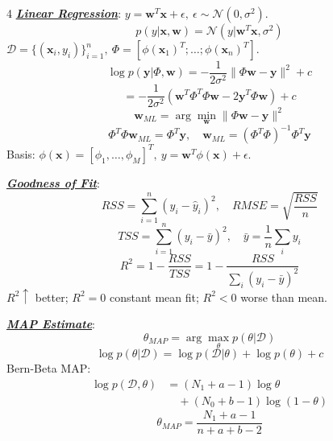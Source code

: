 \documentclass[12pt]{article}
\newcommand{\bulletPoint}[1]{\ul{\textit{\textbf{#1}}}}
\begin{document}
\begin{multicols*}{4}
\bulletPoint{Linear Regression}:
$y=\mathbf{w}^T\mathbf{x}+\epsilon,\ \epsilon\sim\mathcal{N}(0,\sigma^2)$.
\useshortskip \begin{equation*}
    p(y|\mathbf{x},\mathbf{w})=\mathcal{N}(y|\mathbf{w}^T\mathbf{x},\sigma^2)
\end{equation*}
$\mathcal{D}=\{(\mathbf{x}_i,y_i)\}_{i=1}^n,\ \Phi=[\phi(\mathbf{x}_1)^T;\ldots;\phi(\mathbf{x}_n)^T]$.
\useshortskip \begin{equation*}
    \log p(\mathbf{y}|\Phi,\mathbf{w})=-\frac{1}{2\sigma^2}\|\Phi\mathbf{w}-\mathbf{y}\|^2+c
\end{equation*}
\useshortskip \begin{equation*}
    \scriptstyle =-\frac{1}{2\sigma^2}(\mathbf{w}^T\Phi^T\Phi\mathbf{w}-2\mathbf{y}^T\Phi\mathbf{w})+c
\end{equation*}
\useshortskip \begin{equation*}
    \mathbf{w}_{ML}=\arg\min_{\mathbf{w}}\|\Phi\mathbf{w}-\mathbf{y}\|^2
\end{equation*}
\useshortskip \begin{equation*}
    \Phi^T\Phi\mathbf{w}_{ML}=\Phi^T\mathbf{y},\quad
    \mathbf{w}_{ML}=(\Phi^T\Phi)^{-1}\Phi^T\mathbf{y}
\end{equation*}
Basis: $\phi(\mathbf{x})=[\phi_1,\ldots,\phi_M]^T,\ y=\mathbf{w}^T\phi(\mathbf{x})+\epsilon$.

\bulletPoint{Goodness of Fit}:
\useshortskip \begin{equation*}
    RSS=\sum_{i=1}^n(y_i-\hat{y}_i)^2,\quad RMSE=\sqrt{\frac{RSS}{n}}
\end{equation*}
\useshortskip \begin{equation*}
    TSS=\sum_{i=1}^n(y_i-\bar{y})^2,\quad \bar{y}=\frac{1}{n}\sum_i y_i
\end{equation*}
\useshortskip \begin{equation*}
    R^2=1-\frac{RSS}{TSS}=1-\frac{RSS}{\sum_i(y_i-\bar{y})^2}
\end{equation*}
$R^2\uparrow$ better; $R^2=0$ constant mean fit; $R^2<0$ worse than mean.

\bulletPoint{MAP Estimate}:
\useshortskip \begin{equation*}
    \theta_{MAP}=\arg\max_\theta p(\theta|\mathcal{D})
\end{equation*}
\useshortskip \begin{equation*}
    \log p(\theta|\mathcal{D})=\log p(\mathcal{D}|\theta)+\log p(\theta)+c
\end{equation*}
Bern-Beta MAP:
\useshortskip \begin{equation*}
    \begin{split}
        \log p(\mathcal{D},\theta)
        &=(N_1+a-1)\log\theta\\
        &\quad+(N_0+b-1)\log(1-\theta)
    \end{split}
\end{equation*}
\useshortskip \begin{equation*}
    \theta_{MAP}=\frac{N_1+a-1}{n+a+b-2}
\end{equation*}


\end{multicols*}
\end{document}
